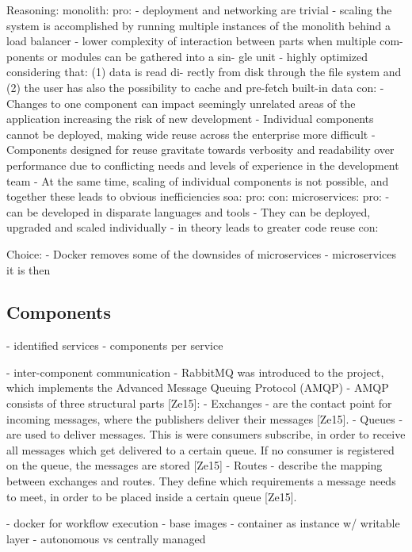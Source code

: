   Reasoning:
    monolith:
      pro:
        - deployment and networking are trivial \cite{Stubbs2015Distributed}
        - scaling the system is accomplished by running multiple instances of the monolith behind a load balancer \cite{Stubbs2015Distributed}
        - lower complexity of interaction between parts when multiple com- ponents or modules can be gathered into a sin- gle unit \cite[p.~14]{Strimbei2015Software}
        - highly optimized considering that: (1) data is read di- rectly from disk through the file system and (2) the user has also the possibility to cache and pre-fetch built-in data  \cite[p.~14]{Strimbei2015Software}
      con:
        - Changes to one component can impact seemingly unrelated areas of the application increasing the risk of new development  \cite{Stubbs2015Distributed}
        - Individual components cannot be deployed, making wide reuse across the enterprise more difficult  \cite{Stubbs2015Distributed}
        - Components designed for reuse gravitate towards verbosity and readability over performance due to  conflicting needs and levels of experience in the development team  \cite{Stubbs2015Distributed}
        - At the same time, scaling of individual components is not possible, and together these leads to obvious inefficiencies \cite{Stubbs2015Distributed}
    soa:
      pro:
      con:
    microservices:
      pro:
        - can be developed in disparate languages and tools  \cite{Stubbs2015Distributed}
        - They can be deployed, upgraded and scaled individually  \cite{Stubbs2015Distributed}
        - in theory leads to greater code reuse \cite{Stubbs2015Distributed}
      con:

  Choice:
    - Docker removes some of the downsides of microservices
    - microservices it is then



\subsection{Components} %
\label{sub:components}
  - identified services
  - components per service

- inter-component communication
  - RabbitMQ was introduced to the project, which implements the Advanced Message Queuing Protocol (AMQP)
  - AMQP consists of three structural parts [Ze15]:
    - Exchanges
      -  are the contact point for incoming messages, where the publishers deliver their messages [Ze15].
    - Queues
      - are used to deliver messages. This is were consumers subscribe, in order to receive all messages which get delivered to a certain queue. If no consumer is registered on the queue, the messages are stored [Ze15]
    - Routes
      -  describe the mapping between exchanges and routes. They define which requirements a message needs to meet, in order to be placed inside a certain queue [Ze15].

- docker for workflow execution
  - base images
  - container as instance w/ writable layer
  - autonomous vs centrally managed
